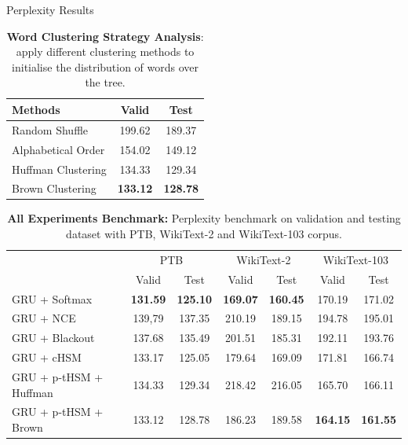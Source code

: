 \documentclass[final,t,unknownkeysallowed]{beamer}
\begin{document}
\begin{frame}{}
\begin{columns}[t]
\begin{column}{.3\linewidth}
\begin{block}{Perplexity Results}
    
    \begin{table}

    \setlength{\abovecaptionskip}{0pt}
    \setlength{\abovedisplayskip}{0pt}
  \centering
  \caption{\textbf{Word Clustering Strategy Analysis}: apply different clustering methods to initialise the distribution of words over the tree.}
  \begin{tabular}{lcc} \toprule
  Methods   & Valid & Test   \\ \midrule
  Random Shuffle &199.62 &  189.37\\
  Alphabetical Order  & 154.02 & 149.12       \\
  Huffman Clustering   & 134.33 & 129.34      \\
  Brown Clustering  & \textbf{133.12} & \textbf{128.78}\\
\bottomrule
  \end{tabular}
\end{table}

\vspace{3ex}

\begin{table}
\setlength{\abovecaptionskip}{0pt}
\setlength{\abovedisplayskip}{0pt}
  \centering
  \caption{\textbf{All Experiments Benchmark:} Perplexity benchmark on validation and testing dataset with PTB, WikiText-2 and WikiText-103 corpus.}
\begin{tabular}{lcccccc}
  \toprule
  & \multicolumn{2}{c}{PTB} & \multicolumn{2}{c}{WikiText-2} & \multicolumn{2}{c}{WikiText-103} \\
  \cmidrule(lr){2-3} \cmidrule(lr){4-5} \cmidrule(lr){6-7}
  & Valid & Test& Valid & Test  & Valid & Test \\ \midrule
  GRU + Softmax                                             &\textbf{131.59}&\textbf{125.10} &\textbf{169.07}&\textbf{160.45}&170.19&171.02\\
  GRU + NCE             &139,79&137.35 &210.19&189.15&194.78&195.01\\
  GRU + Blackout          &137.68&135.49 &201.51&185.31&192.11&193.76\\
  GRU + cHSM                  &133.17&125.05 &179.64&169.09&171.81&166.74\\  \midrule
  GRU + p-tHSM + Huffman &134.33&129.34 &218.42&216.05& 165.70&166.11\\
GRU + p-tHSM + Brown &133.12&128.78       &186.23&189.58 &\textbf{164.15}& \textbf{161.55} \\
  \bottomrule
\end{tabular}
\end{table}
      \end{block}


\end{column}
\end{columns}
\end{frame}
\end{document}
